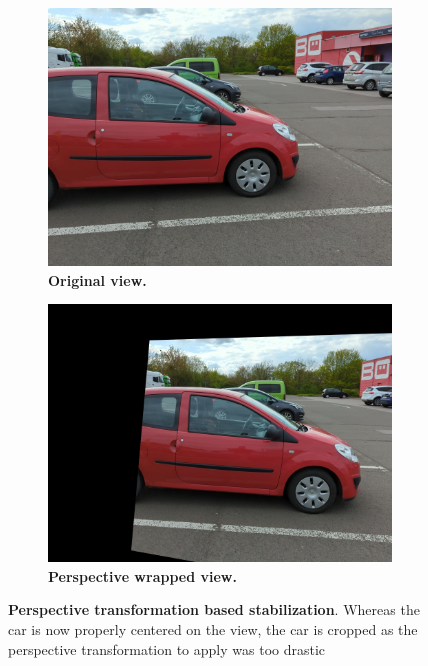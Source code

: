 \begin{figure}[htb!]
  \centering
  \begin{subfigure}[b]{0.45\linewidth}
    \includegraphics[width=\linewidth]{images/gaussiansplatting/gt/img-3.jpg}
    \caption{\textbf{Original view.}}
    \label{fig:view3}
  \end{subfigure}
  \quad %
  \begin{subfigure}[b]{0.45\linewidth}
    \includegraphics[width=\linewidth]{images/gaussiansplatting/stabhomo/img-3.jpg}
    \caption{\textbf{Perspective wrapped view.}}
    \label{fig:gs-view3-homo}
  \end{subfigure}
  \caption{\textbf{Perspective transformation based stabilization}. Whereas the car is now properly centered on the view, the car is cropped as the perspective transformation to apply was too drastic}
  \label{fig:gs-homography-view3}
\end{figure}

